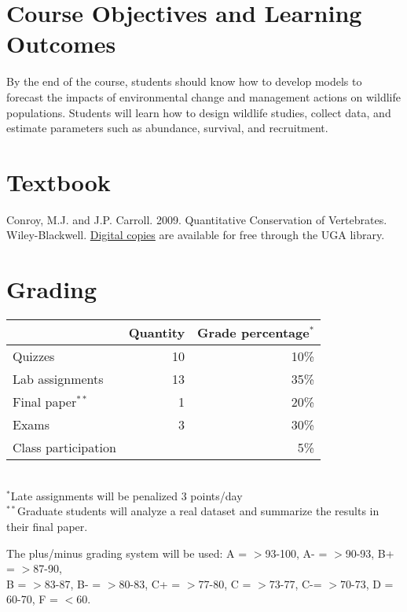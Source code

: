 \documentclass[12pt]{article}
\begin{document}
\vspace{-3mm}
\section*{\normalsize Course Objectives and Learning Outcomes}
\vspace{-4mm}
By the end of the course, students should know how to develop models
to forecast the impacts of environmental change and management actions
on wildlife populations. Students will learn how to design wildlife studies,
collect data, and estimate parameters such as abundance, survival, and
recruitment. 


\vspace{-3mm}
\section*{\normalsize Textbook}
\vspace{-4mm}
Conroy, M.J. and J.P. Carroll. 2009. Quantitative Conservation of
Vertebrates. Wiley-Blackwell. \href{http://preproxy.galib.uga.edu/login?url=http://onlinelibrary.wiley.com/book/10.1002/9781444303155}{Digital
  copies} are available for free through the UGA library. 

\vspace{-3mm}
\section*{\normalsize Grading}
\vspace{-4mm}
\begin{center}
  \begin{tabular}[h!]{lrr}
    \hline
                        & Quantity & Grade percentage$^*$        \\
    \hline
    Quizzes             & 10       & 10\%                        \\
    Lab assignments     & 13       & 35\%                        \\
    Final paper$^{**}$  & 1        & 20\%                        \\
    Exams               & 3        & 30\%                        \\
    Class participation &          & 5\%                         \\
    \hline
  \end{tabular}                                                  \\
  \small
\hspace{0mm} $^*$Late assignments will be penalized 3 points/day \\ 
\hspace{0mm} $^{**}$Graduate students will analyze a real dataset and
summarize the results in their final paper.
\end{center}
\vspace{-6pt}
{%
The plus/minus grading system will be used: %
A = $>$93-100, A- = $>$90-93, B+ = $>$87-90,                     \\ B = $>$83-87,
B- = $>$80-83, C+ = $>$77-80, C = $>$73-77, C-= $>$70-73, D = 60-70, F = $<$60. 
}
\end{document}
